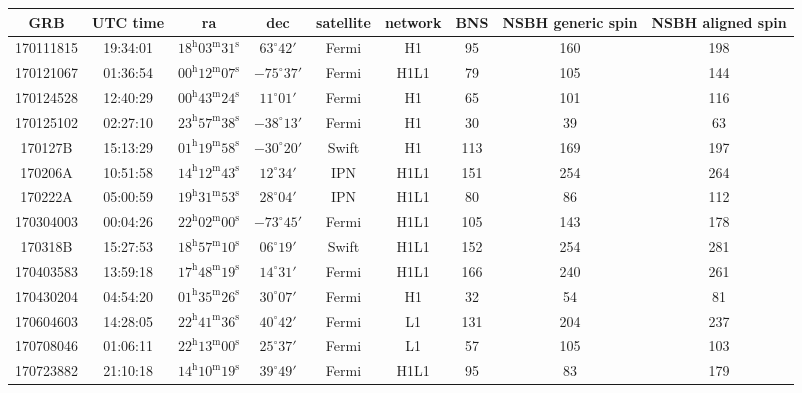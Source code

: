 \documentclass[11pt]{cuthesis}
\begin{document}
\begin{landscape}
\begin{tabular}{ccccccccc}
\hline
 GRB & UTC time & ra & dec & satellite & network & BNS & NSBH generic spin & NSBH aligned spin \\
\hline
170111815 & 19:34:01  & $18^{\mathrm{h}}03^{\mathrm{m}}31^{\mathrm{s}}$ & $63^{\circ}42'$ &  Fermi   & H1     & 95  & 160 & 198 \\
170121067 & 01:36:54  & $00^{\mathrm{h}}12^{\mathrm{m}}07^{\mathrm{s}}$ & $-75^{\circ}37'$ & Fermi   & H1L1   & 79  & 105 & 144 \\
170124528 & 12:40:29  & $00^{\mathrm{h}}43^{\mathrm{m}}24^{\mathrm{s}}$ & $11^{\circ}01'$ &  Fermi  & H1      & 65  & 101 & 116 \\
170125102 & 02:27:10  & $23^{\mathrm{h}}57^{\mathrm{m}}38^{\mathrm{s}}$ & $-38^{\circ}13'$ & Fermi   & H1     & 30  & 39  & 63 \\
170127B   & 15:13:29  & $01^{\mathrm{h}}19^{\mathrm{m}}58^{\mathrm{s}}$ & $-30^{\circ}20'$ & Swift   & H1     & 113 & 169 & 197 \\
170206A   & 10:51:58  & $14^{\mathrm{h}}12^{\mathrm{m}}43^{\mathrm{s}}$ & $12^{\circ}34'$ &  IPN   & H1L1     & 151 & 254 & 264 \\
170222A   & 05:00:59  & $19^{\mathrm{h}}31^{\mathrm{m}}53^{\mathrm{s}}$ & $28^{\circ}04'$ &  IPN   & H1L1     & 80  & 86  & 112 \\
170304003 & 00:04:26  & $22^{\mathrm{h}}02^{\mathrm{m}}00^{\mathrm{s}}$ & $-73^{\circ}45'$ & Fermi   & H1L1   & 105 & 143 & 178 \\
170318B   & 15:27:53  & $18^{\mathrm{h}}57^{\mathrm{m}}10^{\mathrm{s}}$ & $06^{\circ}19'$ &  Swift   & H1L1   & 152 & 254 & 281 \\
170403583 & 13:59:18  & $17^{\mathrm{h}}48^{\mathrm{m}}19^{\mathrm{s}}$ & $14^{\circ}31'$ &  Fermi   & H1L1   & 166 & 240 & 261 \\
170430204 & 04:54:20  & $01^{\mathrm{h}}35^{\mathrm{m}}26^{\mathrm{s}}$ & $30^{\circ}07'$ &  Fermi   & H1     & 32  & 54  & 81 \\
170604603 & 14:28:05  & $22^{\mathrm{h}}41^{\mathrm{m}}36^{\mathrm{s}}$ & $40^{\circ}42'$ &  Fermi   & L1     & 131 & 204 & 237 \\
170708046 & 01:06:11  & $22^{\mathrm{h}}13^{\mathrm{m}}00^{\mathrm{s}}$ & $25^{\circ}37'$ &  Fermi   & L1     & 57  & 105 & 103 \\
170723882 & 21:10:18  & $14^{\mathrm{h}}10^{\mathrm{m}}19^{\mathrm{s}}$ & $39^{\circ}49'$ &  Fermi   & H1L1   & 95  & 83  & 179 \\

\end{tabular}
\end{landscape}
\end{document}
